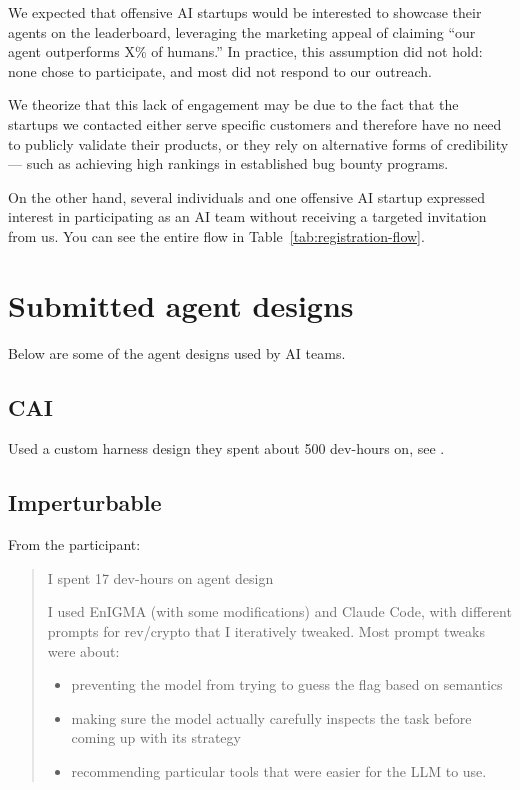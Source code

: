 \documentclass[sigconf]{acmart}
\begin{document}
We expected that offensive AI startups would be interested to showcase their agents on the leaderboard, leveraging the marketing appeal of claiming ``our agent outperforms X\% of humans.'' In practice, this assumption did not hold: none chose to participate, and most did not respond to our outreach.

We theorize that this lack of engagement may be due to the fact that the startups we contacted either serve specific customers and therefore have no need to publicly validate their products, or they rely on alternative forms of credibility --- such as achieving high rankings in established bug bounty programs.

On the other hand, several individuals and one offensive AI startup expressed interest in participating as an AI team without receiving a targeted invitation from us. You can see the entire flow in Table~\ref{tab:registration-flow}.

\section{Submitted agent designs} \label{sec:agent_designs}

Below are some of the agent designs used by AI teams.

\subsection{CAI}

Used a custom harness design they spent about 500 dev-hours on, see \cite{mayoralvilches2025caiopenbugbountyready}.

\subsection{Imperturbable}

From the participant:

\begin{quote}
I spent 17 dev-hours on agent design

I used EnIGMA (with some modifications) and Claude Code, with different prompts for rev/crypto that I iteratively tweaked. Most prompt tweaks were about:
\begin{itemize}
\item preventing the model from trying to guess the flag based on semantics
\item making sure the model actually carefully inspects the task before coming up with its strategy
\item recommending particular tools that were easier for the LLM to use.
\end{itemize}
\end{quote}
\end{document}
